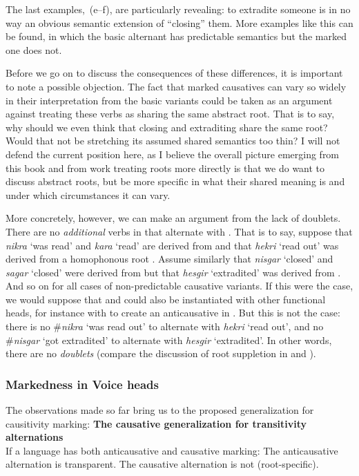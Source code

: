 The last examples,~(\lastx e--f), are particularly revealing: to extradite someone is in no way an obvious semantic extension of ``closing'' them. More examples like this can be found, in which the basic alternant has predictable semantics but the marked one does not.

Before we go on to discuss the consequences of these differences, it is important to note a possible objection. The fact that marked causatives can vary so widely in their interpretation from the basic variants could be taken as an argument against treating these verbs as sharing the same abstract root. That is to say, why should we even think that closing and extraditing share the same root? Would that not be stretching its assumed shared semantics too thin? I will not defend the current position here, as I believe the overall picture emerging from this book and from work treating roots more directly is that we do want to discuss abstract roots, but be more specific in what their shared meaning is and under which circumstances it can vary.

More concretely, however, we can make an argument from the lack of doublets. There are no \emph{additional} verbs in {\tnif} that alternate with {\thif}. That is to say, suppose that \emph{nikra} `was read' and \emph{kara} `read' are derived from  and that \emph{hekri} `read out' was derived from a homophonous root . Assume similarly that \emph{nisgar} `closed' and \emph{sagar} `closed' were derived from  but that \emph{hesgir} `extradited' was derived from . And so on for all cases of non-predictable causative variants. If this were the case, we would suppose that  and  could also be instantiated with other functional heads, for instance with {\vz} to create an anticausative in {\tnif}. But this is not the case: there is no \#\emph{nikra} `was read out' to alternate with \emph{hekri} `read out', and no \#\emph{nisgar} `got extradited' to alternate with \emph{hesgir} `extradited'. In other words, there are no \emph{doublets} (compare the discussion of root suppletion in \citealt{harley14thlia,harley14thlib,harley15roots} and \citealt{borer14thli}).

		\subsubsection{Markedness in Voice heads}
The observations made so far bring us to the proposed generalization for causitivity marking:
\pex \textbf{The causative generalization for transitivity alternations}\\
	If a language has both anticausative and causative marking:
	\a The anticausative alternation is transparent.
	\a The causative alternation is not (root-specific).
\xe


